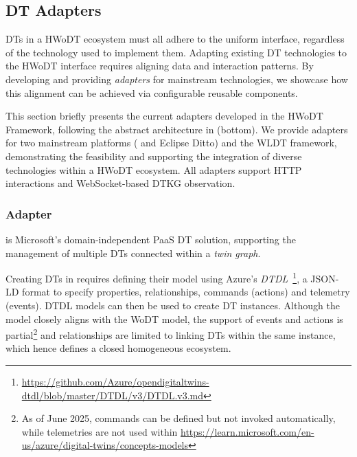 \subsection{\acs{DT} Adapters}
\label{ssec:adapters}

\acp{DT} in a \ac{HWoDT} ecosystem must all adhere to the uniform interface, regardless of the technology used to implement them.
%
Adapting existing \ac{DT} technologies to the \ac{HWoDT} interface requires aligning data and interaction patterns.
%
By developing and providing \emph{adapters} for mainstream technologies, we showcase how this alignment can be achieved via configurable reusable components.

This section briefly presents the current adapters developed in the \ac{HWoDT} Framework, following the abstract architecture in  (bottom). 
%
We provide adapters for two mainstream platforms (\azureTwin{} and Eclipse Ditto) and the \acl{WLDT} framework, demonstrating the feasibility and supporting the integration of diverse technologies within a \ac{HWoDT} ecosystem.
All adapters support HTTP interactions and WebSocket-based \ac{DTKG} observation.

\subsubsection{\azureTwin{} Adapter}

\azureTwin{} is Microsoft's domain-independent \ac{PaaS} \ac{DT} solution, supporting the management of multiple \acp{DT} connected within a \emph{twin graph}.

Creating \acp{DT} in \azureTwin{} requires defining their model using Azure's \emph{\acf{DTDL}}~\footnote{\url{https://github.com/Azure/opendigitaltwins-dtdl/blob/master/DTDL/v3/DTDL.v3.md}}, a JSON-LD format to specify properties, relationships, commands (actions) and telemetry (events).
%
\ac{DTDL} models can then be used to create \ac{DT} instances.
%
Although the model closely aligns with the \ac{WoDT} model, the support of events and actions is partial\footnote{As of June 2025, commands can be defined but not invoked automatically, while telemetries are not used within \azureTwin{} \url{https://learn.microsoft.com/en-us/azure/digital-twins/concepts-models}} and relationships are limited to linking \acp{DT} within the same \azureTwin{} instance, which hence defines a closed homogeneous ecosystem.

